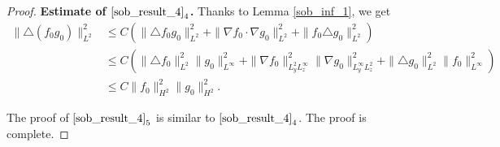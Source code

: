 \documentclass[12pt, reqno]{amsart}
\numberwithin{equation}{section}
\begin{document}
\begin{proof}
		{\bf Estimate of $\eqref{sob_result_4}_4$.}	
		Thanks to Lemma \ref{sob_inf_1}, we get
		\begin{align*}
			\|\triangle(f_{0}g_{0}) \|_{L^{2}}^2
			&\leq C(\|\triangle f_{0}g_{0} \|_{L^{2}}^2
			+\|\nabla f_{0}\cdot \nabla g_{0} \|_{L^{2}}^2
			+\|f_{0}\triangle g_{0} \|_{L^{2}}^2)\\
			&\leq C(\|\triangle f_{0}\|_{L^{2}}^2\|g_{0}\|_{L^{\infty}}^2
			+\|\nabla f_{0}\|_{L^{2}_yL^{\infty}_z}^2
			\|\nabla g_{0} \|_{L^{\infty}_yL^{2}_z}^2
			+\|\triangle g_{0}\|_{L^{2}}^2\|f_{0} \|_{L^{\infty}}^2)\\
			&\leq C\|f_{0} \|_{H^{2}}^2\|g_{0}\|_{H^{2}}^2.
		\end{align*}
		
		
		The proof of $\eqref{sob_result_4}_5$ is similar to $\eqref{sob_result_4}_4$. The proof is complete.
	\end{proof}
	
\end{document}
